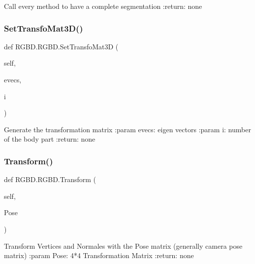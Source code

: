 \begin{DoxyVerb}Call every method to have a complete segmentation
:return: none
\end{DoxyVerb}
 \mbox{\label{class_r_g_b_d_1_1_r_g_b_d_aeac30c5f185a4e6637a63c882bd06d9e}} 
\subsubsection{\texorpdfstring{Set\+Transfo\+Mat3\+D()}{SetTransfoMat3D()}}
{\footnotesize\ttfamily def R\+G\+B\+D.\+R\+G\+B\+D.\+Set\+Transfo\+Mat3D (\begin{DoxyParamCaption}\item[{}]{self,  }\item[{}]{evecs,  }\item[{}]{i }\end{DoxyParamCaption})}

\begin{DoxyVerb}Generate the transformation matrix
:param evecs: eigen vectors
:param i: number of the body part
:return: none
\end{DoxyVerb}
 \mbox{\label{class_r_g_b_d_1_1_r_g_b_d_a0ca12b764dab40af78e8a83a5b9f3011}} 
\subsubsection{\texorpdfstring{Transform()}{Transform()}}
{\footnotesize\ttfamily def R\+G\+B\+D.\+R\+G\+B\+D.\+Transform (\begin{DoxyParamCaption}\item[{}]{self,  }\item[{}]{Pose }\end{DoxyParamCaption})}

\begin{DoxyVerb}Transform Vertices and Normales with the Pose matrix (generally camera pose matrix)
:param Pose: 4*4 Transformation Matrix
:return: none
\end{DoxyVerb}
 \mbox{\label{class_r_g_b_d_1_1_r_g_b_d_a98624ce143f3ea4b766e337467faaf68}} 
